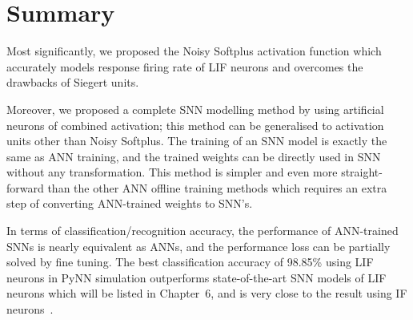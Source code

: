 \section{Summary}
	Most significantly, we proposed the Noisy Softplus activation function which accurately models response firing rate of LIF neurons and overcomes the drawbacks of Siegert units.
%		
%		
%		
%		

	Moreover, we proposed a complete SNN modelling method by using artificial neurons of combined activation;
	this method can be generalised to activation units other than Noisy Softplus.
	The training of an SNN model is exactly the same as ANN training, and the trained weights can be directly used in SNN without any transformation.
	This method is simpler and even more straight-forward than the other ANN offline training methods which requires an extra step of converting ANN-trained weights to SNN's.
	
	In terms of classification/recognition accuracy, the performance of ANN-trained SNNs is nearly equivalent as ANNs, and the performance loss can be partially solved by fine tuning.
	The best classification accuracy of 98.85\% using LIF neurons in PyNN simulation outperforms state-of-the-art SNN models of LIF neurons which will be listed in Chapter~6, and is very close to the result using IF neurons~\cite{diehl2015fast}. 
	


